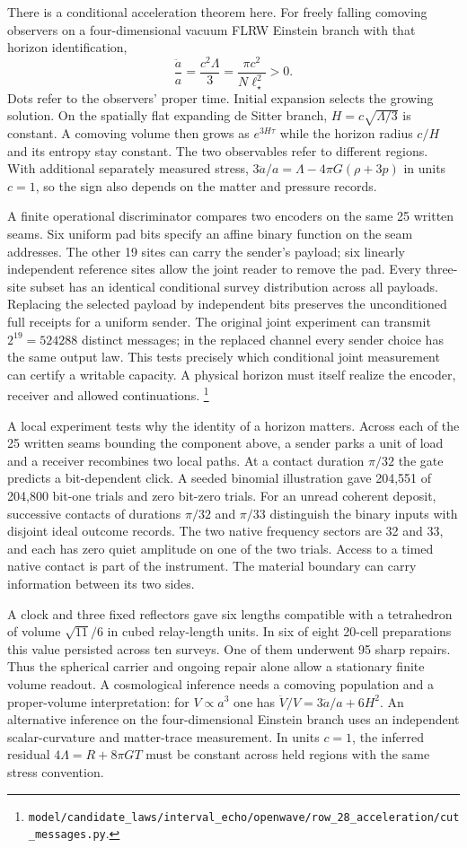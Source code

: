 \documentclass[11pt]{article}
\theoremstyle{remark}
\theoremstyle{plain}
\begin{document}
There is a conditional acceleration theorem here. For freely falling
comoving observers on a four-dimensional vacuum FLRW Einstein branch
with that horizon identification,
\[
  \frac{\ddot a}{a}=\frac{c^2\Lambda}{3}
                    =\frac{\pi c^2}{N\ell_\star^2}>0 .
\]
Dots refer to the observers' proper time. Initial expansion selects
the growing solution. On the spatially flat expanding de Sitter branch,
$H=c\sqrt{\Lambda/3}$ is constant. A comoving volume then grows as
$e^{3H\tau}$ while the horizon radius $c/H$ and its entropy stay
constant. The two observables refer to different regions. With additional
separately measured stress,
$3\ddot a/a=\Lambda-4\pi G(\rho+3p)$ in units $c=1$, so the sign
also depends on the matter and pressure records.

A finite operational discriminator compares two encoders on the same
25 written seams. Six uniform pad bits specify an affine binary
function on the seam addresses. The other 19 sites can carry the
sender's payload; six linearly independent reference sites allow
the joint reader to remove the pad. Every three-site subset has an
identical conditional survey distribution across all payloads.
Replacing the selected payload by independent bits preserves the
unconditioned full receipts for a uniform sender. The original
joint experiment can transmit $2^{19}=524288$ distinct messages;
in the replaced channel every sender choice has the same output law.
This tests precisely which conditional joint measurement can certify
a writable capacity. A physical horizon must itself realize the
encoder, receiver and allowed continuations.%
\footnote{\nolinkurl{model/candidate_laws/interval_echo/openwave/row_28_acceleration/cut_messages.py}.}

A local experiment tests why the identity of a horizon matters. Across
each of the 25 written seams bounding the component above, a sender
parks a unit of load and a receiver recombines two local paths. At a
contact duration $\pi/32$ the gate predicts a bit-dependent click. A
seeded binomial illustration gave 204,551 of 204,800 bit-one trials
and zero bit-zero trials. For an unread
coherent deposit, successive contacts of durations $\pi/32$ and
$\pi/33$ distinguish the binary inputs with disjoint ideal outcome
records. The two native frequency sectors are 32 and 33, and each
has zero quiet amplitude on one of the two trials. Access to a
timed native contact is part of the instrument. The material boundary
can carry information between its two sides.

A clock and three fixed reflectors gave six lengths compatible with a
tetrahedron of volume $\sqrt{11}/6$ in cubed relay-length units. In six
of eight 20-cell preparations this value persisted across ten surveys.
One of them underwent 95 sharp repairs. Thus the spherical carrier and
ongoing repair alone allow a stationary finite volume readout. A
cosmological inference needs a comoving population and a proper-volume
interpretation: for $V\propto a^3$ one has
$\ddot V/V=3\ddot a/a+6H^2$. An alternative inference on the
four-dimensional Einstein branch uses an independent scalar-curvature
and matter-trace measurement. In units $c=1$, the inferred residual
$4\Lambda=R+8\pi G T$ must be constant across held regions with the
same stress convention.
\end{document}
